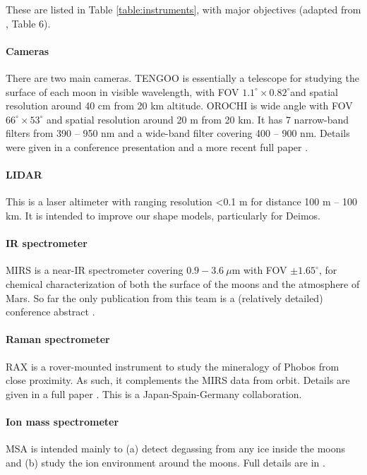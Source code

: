These are listed in Table \ref{table:instruments}, with major objectives (adapted from \citet{kawakatsu_preliminary_2022}{, Table 6}).

\paragraph{Cameras} There are two main cameras. TENGOO is essentially a telescope for studying the surface of each moon in visible wavelength, with FOV $1.1^\circ \times 0.82^\circ$and spatial resolution around 40 cm from 20 km altitude.  OROCHI is wide angle with FOV $66^\circ \times 53^\circ$ and spatial resolution around 20 m from 20 km. It has 7 narrow-band filters from 390 -- 950 nm and a wide-band filter covering 400 -- 900 nm. Details were given in a conference presentation \citep{kameda_telescopic_2019} and a more recent full paper \citep{kameda_design_2021}.
 
\paragraph{LIDAR} This is a laser altimeter with ranging resolution <0.1 m for distance 100 m -- 100 km. It is intended to improve our shape models, particularly for Deimos.

\paragraph{IR spectrometer} MIRS is a near-IR spectrometer covering $0.9-3.6\ \mu$m with FOV $\pm1.65^\circ$, for chemical characterization of both the surface of the moons and the atmosphere of Mars. So far the only publication from this team is a (relatively detailed) conference abstract \citep{barucci_phobos_2022}.

\paragraph{Raman spectrometer} RAX is a rover-mounted instrument to study the mineralogy of Phobos from close proximity. As such, it complements the MIRS data from orbit. Details are given in a full paper \citep{cho_situ_2021}. This is a Japan-Spain-Germany collaboration.

\paragraph{Ion mass spectrometer} MSA is intended mainly to (a) detect degassing from any ice inside the moons and (b) study the ion environment around the moons. Full details are in \citet{yokota_situ_2021}.

